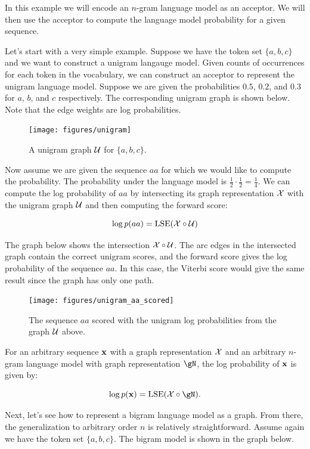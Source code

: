 In this example we will encode an $n$-gram language model as an acceptor. We
will then use the acceptor to compute the language model probability for a
given sequence.

Let's start with a very simple example. Suppose we have the token set $\{a, b,
c\}$ and we want to construct a unigram langauge model. Given counts of
occurrences for each token in the vocabulary, we can construct an acceptor to
represent the unigram language model. Suppose we are given the probabilities
$0.5$, $0.2$, and $0.3$ for $a$, $b$, and $c$ respectively. The corresponding
unigram graph is shown below. Note that the edge weights are log probabilities.

\begin{figure}
    \centering
    \texttt{[image: figures/unigram]}
    \caption{A unigram graph $\mathcal{U}$ for $\{a, b, c\}$.}
    \label{fig:unigram}
\end{figure}

Now assume we are given the sequence $aa$ for which we would like to compute
the probability. The probability under the language model is $\frac{1}{2} \cdot
\frac{1}{2} = \frac{1}{4}$. We can compute the log probability of $aa$ by
intersecting its graph representation $\mathcal{X}$ with the unigram graph $\mathcal{U}$ and
then computing the forward score:

$$
\log p(aa) = \operatorname*{\textrm{LSE}} (\mathcal{X} \circ \mathcal{U})
$$


The graph below shows the intersection $\mathcal{X} \circ \mathcal{U}$. The arc edges in the
intersected graph contain the correct unigram scores, and the forward score
gives the log probability of the sequence $aa$. In this case, the Viterbi score
would give the same result since the graph has only one path.

\begin{figure}
    \centering
    \texttt{[image: figures/unigram\_aa\_scored]}
    \caption{The sequence $aa$ scored with the unigram log probabilities from
    the graph $\mathcal{U}$ above.}
    \label{fig:unigram_aa_scored}
\end{figure}

For an arbitrary sequence ${\bf x}$ with a graph representation $\mathcal{X}$ and an
arbitrary $n$-gram language model with graph representation $\gN$, the log
probability of ${\bf x}$ is given by:

$$
\log p(\vx) = \LSE(\gX \circ \gN).
$$

Next, let's see how to represent a bigram language model as a graph. From
there, the generalization to arbitrary order $n$ is relatively straightforward.
Assume again we have the token set $\{a, b, c\}$. The bigram model is shown in
the graph below.

